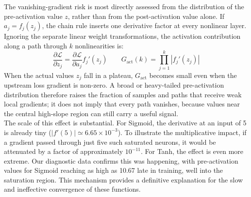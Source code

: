 
The vanishing-gradient risk is most directly assessed from the distribution of the pre-activation value $z$, rather than from the post-activation value alone. If $a_j=f_j(z_j)$, the chain rule inserts one derivative factor at every nonlinear layer. Ignoring the separate linear weight transformations, the activation contribution along a path through $k$ nonlinearities is:
\begin{equation}
    \frac{\partial\mathcal{L}}{\partial z_j}
    =\frac{\partial\mathcal{L}}{\partial a_j}f_j'(z_j)
    \qquad
    G_{\mathrm{act}}(k)=\prod_{j=1}^{k}\left|f_j'(z_j)\right|
    \label{eq:04_activation_chain_gradient}
\end{equation}
When the actual values $z_j$ fall in a plateau, $G_{\mathrm{act}}$ becomes small even when the upstream loss gradient is non-zero. A broad or heavy-tailed pre-activation distribution therefore raises the fraction of samples and paths that receive weak local gradients; it does not imply that every path vanishes, because values near the central high-slope region can still carry a useful signal.\\

The scale of this effect is substantial. For Sigmoid, the derivative at an input of 5 is already tiny ($|f'(5)|\simeq6.65\times10^{-3}$). To illustrate the multiplicative impact, if a gradient passed through just five such saturated neurons, it would be attenuated by a factor of approximately $10^{-11}$. For Tanh, the effect is even more extreme. Our diagnostic data confirms this was happening, with pre-activation values for Sigmoid reaching as high as 10.67 late in training, well into the saturation region. This mechanism provides a definitive explanation for the slow and ineffective convergence of these functions.\\

